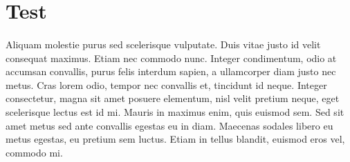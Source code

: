 \documentclass[12pt]{article}
\begin{document}
\section{Test}
\paragraph{}
Aliquam molestie purus sed scelerisque vulputate. Duis vitae justo id velit consequat maximus. Etiam nec commodo nunc. Integer condimentum, odio at accumsan convallis, purus felis interdum sapien, a ullamcorper diam justo nec metus. Cras lorem odio, tempor nec convallis et, tincidunt id neque. Integer consectetur, magna sit amet posuere elementum, nisl velit pretium neque, eget scelerisque lectus est id mi. Mauris in maximus enim, quis euismod sem. Sed sit amet metus sed ante convallis egestas eu in diam. Maecenas sodales libero eu metus egestas, eu pretium sem luctus. Etiam in tellus blandit, euismod eros vel, commodo mi.
\end{document}
